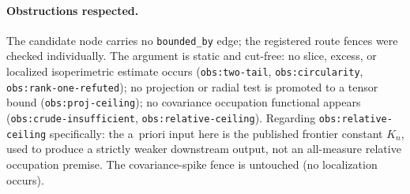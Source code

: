 \documentclass[../main.tex]{subfiles}
\begin{document}
\paragraph{Obstructions respected.}
The candidate node carries no \texttt{bounded\_by} edge; the registered route fences
were checked individually.  The argument is static and cut-free: no slice, excess, or
localized isoperimetric estimate occurs (\texttt{obs:two-tail},
\texttt{obs:circularity}, \texttt{obs:rank-one-refuted}); no projection or radial test
is promoted to a tensor bound (\texttt{obs:proj-ceiling}); no covariance occupation
functional appears (\texttt{obs:crude-insufficient},
\texttt{obs:relative-ceiling}).  Regarding \texttt{obs:relative-ceiling} specifically:
the a~priori input here is the published frontier constant $K_n$, used to produce a
strictly weaker downstream output, not an all-measure relative occupation premise.  The
covariance-spike fence is untouched (no localization occurs).

\end{document}
